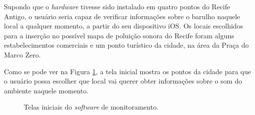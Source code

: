 \documentclass[
    12pt,               %
    openright,          %
    oneside,
    a4paper,            
    english,            %
    brazil              %
    ]{abntex2}
\begin{document}
Supondo que o \textit{hardware} tivesse sido instalado em quatro pontos do Recife Antigo, o usuário seria capaz de verificar informações sobre o barulho naquele local a qualquer momento, a partir do seu dispositivo iOS.  Os locais escolhidos para a inserção no possível mapa de poluição sonora do Recife foram alguns estabelecimentos comerciais e um ponto turístico da cidade, na área da Praça do Marco Zero.

Como se pode ver na Figura \ref{rodando}, a tela inicial mostra os pontos da cidade para que o usuário possa escolher que local vai querer obter informações sobre o som do ambiente naquele momento. 


\begin{figure}[!htb]
  \caption{Telas iniciais do \textit{software} de monitoramento.}
    \centering
    \qquad
    \label{rodando}
\end{figure}
\end{document}
